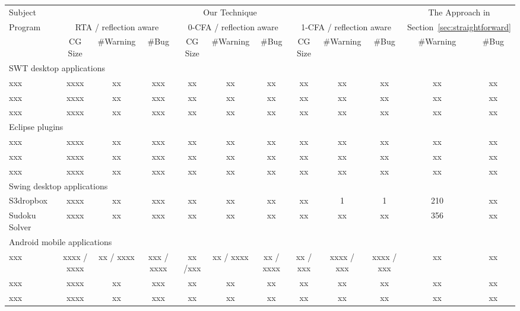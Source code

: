 \begin{table*}[ht]
\begin{center}
 \fontsize{9pt}{\baselineskip}\selectfont
\hspace*{-0.2cm}
\setlength{\tabcolsep}{.65\tabcolsep}
\begin{tabular}{|l||c|c|c||c|c|c||c|c|c||c|c|}
\hline
 Subject&  \multicolumn{9}{|c||}{Our Technique} & \multicolumn{2}{|c|}{The Approach in}  \\
\cline{2-10}
 Program  &  \multicolumn{3}{|c|}{RTA / reflection aware}& \multicolumn{3}{|c|}{0-CFA / reflection aware} & \multicolumn{3}{|c||}{1-CFA / reflection aware} & \multicolumn{2}{|c|}{Section~\ref{sec:straightforward}}  \\
\cline{2-12}
 & CG Size & \#Warning & \#Bug & CG Size & \#Warning & \#Bug & CG Size & \#Warning & \#Bug & \#Warning & \#Bug\\
\hline \hline
\multicolumn{12}{|l|}{SWT desktop applications}   \\
 \hline
 xxx &  xxxx &  xx &  xxx & xx & xx & xx& xx & xx & xx& xx & xx \\
 \hline
 xxx &  xxxx &  xx &  xxx & xx & xx & xx& xx & xx & xx& xx & xx \\
 \hline
 xxx &  xxxx &  xx &  xxx & xx & xx & xx& xx & xx & xx& xx & xx \\
 \hline
 \hline
\multicolumn{12}{|l|}{Eclipse plugins}   \\
 \hline
 xxx &  xxxx &  xx &  xxx & xx & xx & xx& xx & xx & xx& xx & xx \\
 \hline
 xxx &  xxxx &  xx &  xxx & xx & xx & xx& xx & xx & xx& xx & xx \\
 \hline
 xxx &  xxxx &  xx &  xxx & xx & xx & xx& xx & xx & xx& xx & xx \\
 \hline
 \hline
\multicolumn{12}{|l|}{Swing desktop applications}   \\
 \hline
 S3dropbox &  xxxx &  xx &  xxx & xx & xx & xx& xx & 1 & 1 & 210 & xx \\
 \hline
  Sudoku Solver&  xxxx &  xx &  xxx & xx & xx & xx& xx & xx & xx& 356 & xx \\
 \hline
 \hline
\multicolumn{12}{|l|}{Android mobile applications}   \\
 \hline
 xxx &  xxxx / xxxx &  xx / xxxx &  xxx / xxxx & xx /xxx & xx / xxxx  & xx / xxxx& xx / xxx & xxxx / xxx  & xxxx / xxx& xx & xx \\
 \hline
 xxx &  xxxx &  xx &  xxx & xx & xx & xx& xx & xx & xx& xx & xx \\
 \hline
 xxx &  xxxx &  xx &  xxx & xx & xx & xx& xx & xx & xx& xx & xx \\

\end{tabular}
\end{center}
\end{table*}
